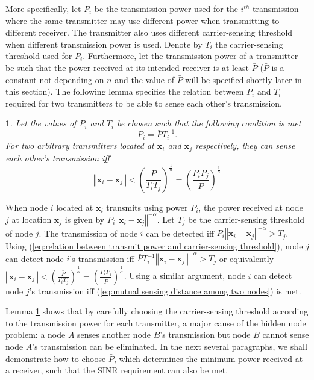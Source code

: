 \documentclass[english]{IEEEtran}
\theoremstyle{plain}
\theoremstyle{plain}
\theoremstyle{plain}
\newtheorem{lem}[thm]{\protect\lemmaname}
\theoremstyle{remark}
\providecommand{\lemmaname}{Lemma}
\begin{document}
More specifically, let $P_{i}$ be the transmission power used for
the $i^{th}$ transmission where the same transmitter may use different
power when transmitting to different receiver. The transmitter also
uses different carrier-sensing threshold when different transmission
power is used. Denote by $T_{i}$ the carrier-sensing threshold used
for $P_{i}$. Furthermore, let the transmission power of a transmitter
be such that the power received at its intended receiver is at least
$\bar{P}$ ($\bar{P}$ is a constant not depending on $n$ and the
value of $\bar{P}$ will be specified shortly later in this section).
The following lemma specifies the relation between $P_{i}$ and $T_{i}$
required for two transmitters to be able to sense each other's transmission.
\begin{lem}
\label{lem:mutually sense range}Let the values of $P_{i}$ and $T_{i}$
be chosen such that the following condition is met 
\begin{equation}
P_{i}=\bar{P}T_{i}^{-1}.\label{eq:relation between transmit power and carrier-sensing threshold}
\end{equation}
For two arbitrary transmitters located at $\boldsymbol{x}_{i}$ and
$\boldsymbol{x}_{j}$ respectively, they can sense each other's transmission
iff 
\begin{equation}
\left\Vert \boldsymbol{x}_{i}-\boldsymbol{x}_{j}\right\Vert <\left(\frac{\bar{P}}{T_{i}T_{j}}\right)^{\frac{1}{\alpha}}=\left(\frac{P_{i}P_{j}}{\bar{P}}\right)^{\frac{1}{\alpha}}\label{eq:mutual sensing distance among two nodes}
\end{equation}
\end{lem}
\begin{IEEEproof}
When node $i$ located at $\boldsymbol{x}_{i}$ transmits using power
$P_{i}$, the power received at node $j$ at location $\boldsymbol{x}_{j}$
is given by $P_{i}\left\Vert \boldsymbol{x}_{i}-\boldsymbol{x}_{j}\right\Vert ^{-\alpha}$.
Let $T_{j}$ be the carrier-sensing threshold of node $j$. The transmission
of node $i$ can be detected iff $P_{i}\left\Vert \boldsymbol{x}_{i}-\boldsymbol{x}_{j}\right\Vert ^{-\alpha}>T_{j}$.
Using (\ref{eq:relation between transmit power and carrier-sensing threshold}),
node $j$ can detect node $i$'s transmission iff $\bar{P}T_{i}^{-1}\left\Vert \boldsymbol{x}_{i}-\boldsymbol{x}_{j}\right\Vert ^{-\alpha}>T_{j}$
or equivalently $\left\Vert \boldsymbol{x}_{i}-\boldsymbol{x}_{j}\right\Vert <\left(\frac{\bar{P}}{T_{i}T_{j}}\right)^{\frac{1}{\alpha}}=\left(\frac{P_{i}P_{j}}{\bar{P}}\right)^{\frac{1}{\alpha}}$.
Using a similar argument, node $i$ can detect node $j$'s transmission
iff (\ref{eq:mutual sensing distance among two nodes}) is met.
\end{IEEEproof}
Lemma \ref{lem:mutually sense range} shows that by carefully choosing
the carrier-sensing threshold according to the transmission power
for each transmitter, a major cause of the hidden node problem: a
node $A$ senses another node $B$'s transmission but node $B$ cannot
sense node $A$'s transmission can be eliminated. In the next several
paragraphs, we shall demonstrate how to choose $\bar{P}$, which determines
the minimum power received at a receiver, such that the SINR requirement
can also be met.
\end{document}
